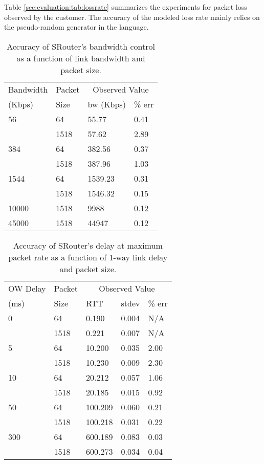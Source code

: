 \documentclass[conference]{IEEEtran}
\begin{document}
Table \ref{sec:evaluation:tab:lossrate} summarizes the experiments for
packet loss observed by the customer. The accuracy of the modeled loss
rate mainly relies on the pseudo-random generator in the language.

\begin{table}[!tb]
  \caption{Accuracy of SRouter's bandwidth control as a function of link bandwidth and packet size.}
  \begin{tabular}{ | p{1.2cm} | p{1cm} || p{2.2cm} | p{2.2cm} | }
    \hline
    Bandwidth & Packet & \multicolumn{2}{c|}{Observed Value} \\
    (Kbps)    & Size   & bw (Kbps) & \% err \\
    \hline
    56 & 64 & 55.77 & 0.41 \\
    & 1518 & 57.62 & 2.89 \\
    \hline
    384 & 64 & 382.56 & 0.37 \\
    & 1518 & 387.96 & 1.03 \\
    \hline
    1544 & 64 & 1539.23 & 0.31 \\
    & 1518 & 1546.32 & 0.15 \\
    \hline
    10000 & 1518 & 9988 & 0.12 \\
    \hline
    45000 & 1518 & 44947 & 0.12 \\
    \hline
  \end{tabular}
  \label{sec:evaluation:tab:bandwidth}
  \vskip -5mm
\end{table}


\begin{table}[!tb]
  \caption{Accuracy of SRouter's delay at maximum packet rate as a
    function of 1-way link delay and packet size.}
  \begin{tabular}{ | p{1.2cm} | p{1cm} || p{1.33cm} | p{1.33cm} | p{1.33cm} | }
    \hline
    OW Delay & Packet & \multicolumn{3}{c|}{Observed Value} \\
    (ms)   & Size   & RTT & stdev & \% err\\
    \hline
    0 & 64 & 0.190 & 0.004 & N/A \\
    & 1518 & 0.221 & 0.007 & N/A \\
    \hline
    5 & 64 & 10.200 & 0.035 & 2.00 \\
    & 1518 & 10.230 & 0.009 & 2.30 \\
    \hline
    10 & 64 & 20.212 & 0.057 & 1.06\\
    & 1518 & 20.185 & 0.015& 0.92 \\
    \hline
    50 & 64 & 100.209 & 0.060 & 0.21 \\
    & 1518 & 100.218 & 0.031 & 0.22 \\
    \hline
    300 & 64 & 600.189 & 0.083 & 0.03 \\
    & 1518 & 600.273 & 0.034 & 0.04 \\
    \hline
  \end{tabular}
  \label{sec:evaluation:tab:delay}
\end{table}
\end{document}
